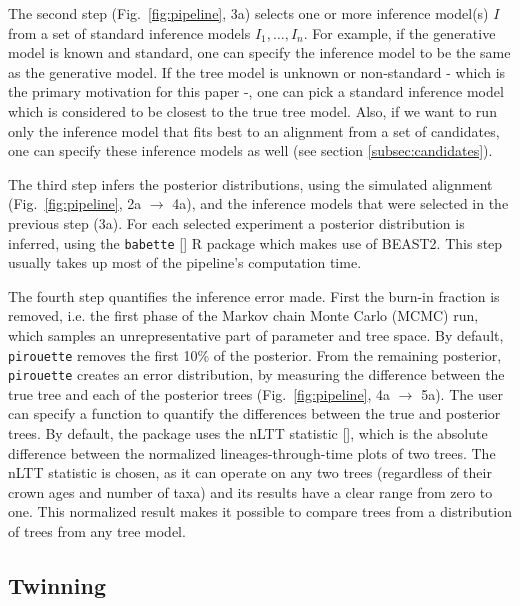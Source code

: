 The second step (Fig.~\ref{fig:pipeline}, 3a)
selects one or more inference model(s) $I$ from 
a set of standard inference models $I_{1},\dots,I_{n}$.
For example, if the generative model is known and standard,
one can specify the inference model to be the same as the generative model.
If the tree model is unknown or non-standard - which is the primary 
motivation for this paper -, one can pick
a standard inference model which is considered 
to be closest to the true tree model.
Also, if we want to run only the inference
model that fits best to an alignment from a set of candidates,
one can specify these inference models as 
well (see section \ref{subsec:candidates}).

The third step infers the posterior distributions,
using the simulated alignment (Fig.~\ref{fig:pipeline}, 2a $\rightarrow$ 4a),
and the inference models that were selected in the previous step (3a). 
For each selected experiment a posterior distribution is inferred, using the 
\verb;babette; [\cite{bilderbeek2018babette}] R package which makes use of BEAST2. 
This step usually takes up most of the pipeline's computation time.

The fourth step quantifies the inference error made. 
First the burn-in fraction is removed, i.e. the first phase of the 
Markov chain Monte Carlo (MCMC) run,
which samples an unrepresentative part of parameter and tree space. 
By default, \verb;pirouette; 
removes the first 10\% of the posterior.
From the remaining posterior, \verb;pirouette; 
creates an error distribution, by measuring the difference
between the true tree and each of the posterior 
trees (Fig.~\ref{fig:pipeline}, 4a $\rightarrow$ 5a).
The user can specify a function to quantify the differences between
the true and posterior trees. By default, the package uses the nLTT 
statistic [\cite{janzen2015approximate}], which is the absolute difference
between the normalized lineages-through-time plots of two trees.
The nLTT statistic is chosen, as it can operate on any two trees (regardless
of their crown ages and number of taxa) and its results have a clear range
from zero to one. This normalized result makes it possible to compare trees 
from a distribution of trees from any tree model.

\subsection{Twinning}\label{subsec:twinning}

